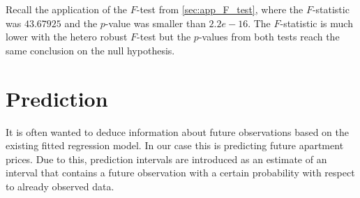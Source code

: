 Recall the application of the $F$-test from \ref{sec:app_F_test}, where the $F$-statistic was $43.67925$ and the $p$-value was smaller than $2.2e-16$. The $F$-statistic is much lower with the hetero robust $F$-test but the $p$-values from both tests reach the same conclusion on the null hypothesis. 




    

































\section{Prediction}\label{sec:prediction}
It is often wanted to deduce information about future observations based on the existing fitted regression model. 
In our case this is predicting future apartment prices. 
Due to this, prediction intervals are introduced as an estimate of an interval that contains a future observation with a certain probability with respect to already observed data.


